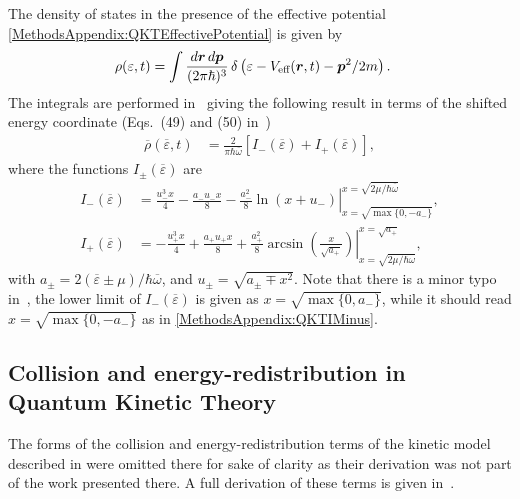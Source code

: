 The density of states in the presence of the effective potential \eqref{MethodsAppendix:QKTEffectivePotential} is given by
\begin{align}
    \rho(\varepsilon, t) &= \int \frac{d \vect{r}\, d \vect{p}}{(2\pi \hbar)^3} \,\delta\left(\varepsilon - V_\text{eff}(\vect{r}, t) - \vect{p}^2/2 m\right).
    \label{MethodsAppendix:DensityOfStatesDefinition}
\end{align}
The integrals are performed in~\citep{Bijlsma:2000} giving the following result in terms of the shifted energy coordinate (Eqs.~(49) and (50) in~\citep{Bijlsma:2000})
\begin{align}
    \overline{\rho}(\overline{\varepsilon}, t) &= \frac{2}{\pi \hbar \overline{\omega}} \left[I_-(\overline{\varepsilon}) + I_+(\overline{\varepsilon})\right],
\end{align}
where the functions $I_\pm(\overline{\varepsilon})$ are
\begin{align}
    I_-(\overline{\varepsilon}) &= \left.\frac{u_-^3 x}{4} - \frac{a_- u_- x}{8} - \frac{a_-^2}{8}\ln(x + u_-)\right|_{x=\sqrt{\max\{0, -a_-\}}}^{x=\sqrt{2\mu/\hbar \overline{\omega}}}, \label{MethodsAppendix:QKTIMinus}\\
    I_+(\overline{\varepsilon}) &= \left.- \frac{u_+^3 x}{4} + \frac{a_+ u_+ x}{8} + \frac{a_+^2}{8} \arcsin\left(\frac{x}{\sqrt{a_+}}\right)\right|_{x=\sqrt{2\mu/\hbar\overline{\omega}}}^{x=\sqrt{a_+}}, \label{MethodsAppendix:QKTIPlus}
\end{align}
with $a_\pm = 2(\overline{\varepsilon}\pm \mu)/\hbar\overline{\omega}$, and $u_\pm = \sqrt{a_\pm \mp x^2}$. Note that there is a minor typo in~\citet{Bijlsma:2000}, the lower limit of $I_-(\overline{\varepsilon})$ is given as $x=\sqrt{\max\{0, a_-\}}$, while it should read $x=\sqrt{\max\{0, -a_-\}}$ as in \eqref{MethodsAppendix:QKTIMinus}.

\subsection{Collision and energy-redistribution in Quantum Kinetic Theory}
\label{MethodsAppendix:QKTOtherTerms}

The forms of the collision and energy-redistribution terms of the kinetic model described in  were omitted there for sake of clarity as their derivation was not part of the work presented there.  A full derivation of these terms is given in~\citep{Bijlsma:2000,Proukakis:2008}.

